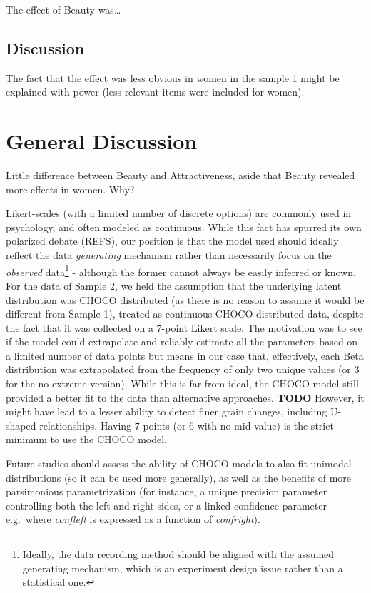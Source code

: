 \documentclass[
  jou,
  floatsintext,
  longtable,
  nolmodern,
  notxfonts,
  notimes,
  colorlinks=true,linkcolor=blue,citecolor=blue,urlcolor=blue]{apa7}
\begin{document}
The effect of Beauty was\ldots{}

\subsection{Discussion}\label{discussion-1}

The fact that the effect was less obvious in women in the sample 1 might
be explained with power (less relevant items were included for women).

\section{General Discussion}\label{general-discussion}

Little difference between Beauty and Attractiveness, aside that Beauty
revealed more effects in women. Why?

Likert-scales (with a limited number of discrete options) are commonly
used in psychology, and often modeled as continuous. While this fact has
spurred its own polarized debate (REFS), our position is that the model
used should ideally reflect the data \emph{generating} mechanism rather
than necessarily focus on the \emph{observed} data\footnote{Ideally, the
  data recording method should be aligned with the assumed generating
  mechanism, which is an experiment design issue rather than a
  statistical one.} - although the former cannot always be easily
inferred or known. For the data of Sample 2, we held the assumption that
the underlying latent distribution was CHOCO distributed (as there is no
reason to assume it would be different from Sample 1), treated as
continuous CHOCO-distributed data, despite the fact that it was
collected on a 7-point Likert scale. The motivation was to see if the
model could extrapolate and reliably estimate all the parameters based
on a limited number of data points but means in our case that,
effectively, each Beta distribution was extrapolated from the frequency
of only two unique values (or 3 for the no-extreme version). While this
is far from ideal, the CHOCO model still provided a better fit to the
data than alternative approaches. \textbf{TODO} However, it might have
lead to a lesser ability to detect finer grain changes, including
U-shaped relationships. Having 7-points (or 6 with no mid-value) is the
strict minimum to use the CHOCO model.

Future studies should assess the ability of CHOCO models to also fit
unimodal distributions (so it can be used more generally), as well as
the benefits of more parsimonious parametrization (for instance, a
unique precision parameter controlling both the left and right sides, or
a linked confidence parameter e.g.~where \emph{confleft} is expressed as
a function of \emph{confright}).
\end{document}
